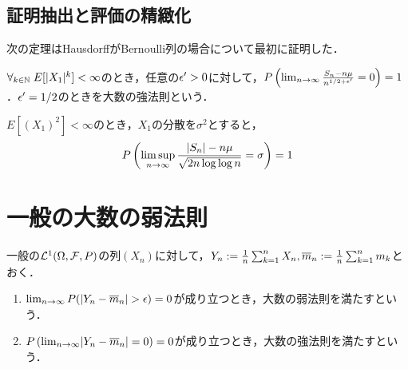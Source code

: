 \documentclass[uplatex,dvipdfmx]{jsreport}
\begin{document}
\subsection{証明抽出と評価の精緻化}

\begin{tcolorbox}[colframe=ForestGreen, colback=ForestGreen!10!white,breakable,colbacktitle=ForestGreen!40!white,coltitle=black,fonttitle=\bfseries\sffamily,
title=]
    次の定理はHausdorffがBernoulli列の場合について最初に証明した．
\end{tcolorbox}

\begin{theorem}
    $\forall_{k\in\mathbb{N}}\;E[\lvert X_1\rvert^k]<\infty$のとき，任意の$\epsilon'>0$に対して，$P\left(\lim_{n\to\infty}\frac{S_n-n\mu}{n^{1/2+\epsilon'}}=0\right)=1$．$\epsilon'=1/2$のときを大数の強法則という．
\end{theorem}

\begin{theorem}
    $E[(X_1)^2]<\infty$のとき，$X_1$の分散を$\sigma^2$とすると，
    \[P\left(\limsup_{n\to\infty}\frac{\lvert S_n\rvert-n\mu}{\sqrt{2n\log\log n}}=\sigma\right)=1\]
\end{theorem}

\section{一般の大数の弱法則}

\begin{definition}
    一般の$\mathcal{L}^1(\Omega,\mathcal{F},P)$の列$(X_n)$に対して，$Y_n:=\frac{1}{n}\sum_{k=1}^nX_n,\overline{m}_n:=\frac{1}{n}\sum_{k=1}^nm_k$とおく．
    \begin{enumerate}
        \item $\lim_{n\to\infty}P(\lvert Y_n-\overline{m}_n\rvert>\epsilon)=0$が成り立つとき，大数の弱法則を満たすという．
        \item $P\left(\lim_{n\to\infty}\lvert Y_n-\overline{m}_n\rvert=0\right)=0$が成り立つとき，大数の強法則を満たすという．
    \end{enumerate}
\end{definition}
\end{document}
